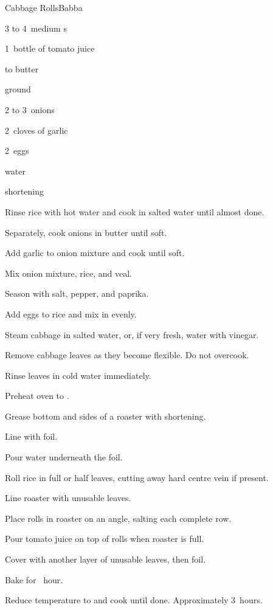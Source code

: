 \begin{recipe}{Cabbage Rolls}{Babba}{}

\begin{ingredients}
\item 3 to 4~medium s
\item 1~bottle of tomato juice
\item {} 
\item \lbs{\quarter} to \lbs{\half} butter
\item {} ground 
\item 2 to 3~onions
\item 2~cloves of garlic
\item 2~eggs
\item {} water
\item shortening
\end{ingredients}

\begin{directions}
\item Rinse rice with hot water and cook in salted water until almost done.
\item Separately, cook onions in butter until soft.
\item Add garlic to onion mixture and cook until soft.
\item Mix onion mixture, rice, and veal.
\item Season with salt, pepper, and paprika.
\item Add eggs to rice and mix in evenly.
\item Steam cabbage in salted water, or, if very fresh, water with vinegar.
\item Remove cabbage leaves as they become flexible. Do not overcook.
\item Rinse leaves in cold water immediately.
\item Preheat oven to .
\item Grease bottom and sides of a roaster with shortening.
\item Line with foil.
\item Pour water underneath the foil.
\item Roll rice in full or half leaves, cutting away hard centre vein if present.
\item Line roaster with unusable leaves.
\item Place rolls in roaster on an angle, salting each complete row.
\item Pour tomato juice on top of rolls when roaster is full.
\item Cover with another layer of unusable leaves, then foil.
\item Bake for \half~hour.
\item Reduce temperature to  and cook until done. Approximately 3~hours.
\end{directions}

\end{recipe}
